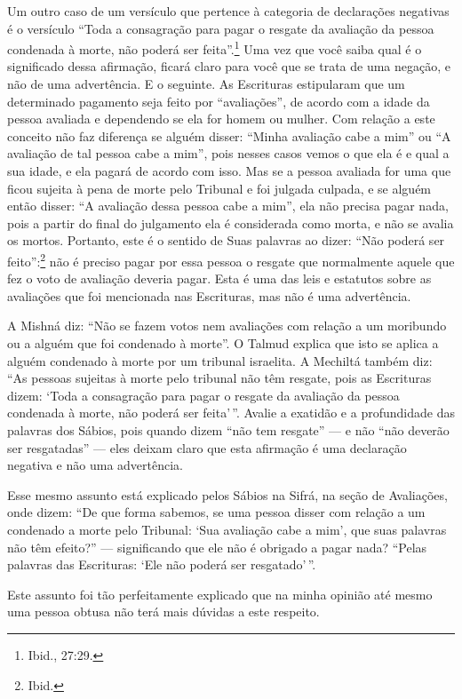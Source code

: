 Um outro caso de um versículo que pertence à categoria de declarações
negativas é o versículo ``Toda a consagração para pagar o resgate da
avaliação da pessoa condenada à morte, não poderá ser feita''.\footnote{Ibid.,
27:29.} Uma vez que você saiba qual é o significado dessa afirmação,
ficará claro para você que se trata de uma negação, e não de uma
advertência. E o seguinte. As Escrituras estipularam que um determinado
pagamento seja feito por ``avaliações'', de acordo com a idade da pessoa
avaliada e dependendo se ela for homem ou mulher. Com relação a este
conceito não faz diferença se alguém disser: ``Minha avaliação cabe a
mim'' ou ``A avaliação de tal pessoa cabe a mim'', pois nesses casos
vemos o que ela é e qual a sua idade, e ela pagará de acordo com isso.
Mas se a pessoa avaliada for uma que ficou sujeita à pena de morte pelo
Tribunal e foi julgada culpada, e se alguém então disser: ``A avaliação
dessa pessoa cabe a mim'', ela não precisa pagar nada, pois a partir do
final do julgamento ela é considerada como morta, e não se avalia os
mortos. Portanto, este é o sentido de Suas palavras ao dizer: ``Não
poderá ser feito'':\footnote{Ibid.} não é preciso pagar por essa pessoa o
resgate que normalmente aquele que fez o voto de avaliação deveria
pagar. Esta é uma das leis e estatutos sobre as avaliações que foi
mencionada nas Escrituras, mas não é uma advertência.

A Mishná\starr{} diz: ``Não se fazem votos nem avaliações com relação a um
moribundo ou a alguém que foi condenado à morte''. O Talmud\starr{} explica que
isto se aplica a alguém condenado à morte por um tribunal israelita. A
Mechiltá\starr{} também diz: ``As pessoas sujeitas à morte pelo tribunal não têm
resgate, pois as Escrituras dizem: `Toda a consagração para pagar o
resgate da avaliação da pessoa condenada à morte, não poderá ser
feita'\,''. Avalie a exatidão e a profundidade das palavras dos Sábios,
pois quando dizem ``não tem resgate'' --- e não ``não deverão ser
resgatadas'' --- eles deixam claro que esta afirmação é uma declaração
negativa e não uma advertência.

Esse mesmo assunto está explicado pelos Sábios na Sifrá\starr, na seção de
Avaliações, onde dizem: ``De que forma sabemos, se uma pessoa disser com
relação a um condenado a morte pelo Tribunal: `Sua avaliação cabe a
mim', que suas palavras não têm efeito?'' --- significando que ele não é
obrigado a pagar nada? ``Pelas palavras das Escrituras: `Ele não poderá
ser resgatado'\,''.

Este assunto foi tão perfeitamente explicado que na minha opinião até
mesmo uma pessoa obtusa não terá mais dúvidas a este respeito.

